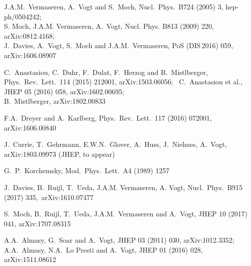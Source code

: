 \documentclass[12pt]{article}
\begin{document}
{\footnotesize

% 
% 

\providecommand{\href}[2]{#2}\begingroup\raggedright\begin{thebibliography}{100}

J.A.M.~Vermaseren, A.~Vogt and S.~Moch,
  Nucl.\ Phys.\ B724 (2005) 3, hep-ph/0504242; \\[0.2mm]
S. Moch, J.A.M. Vermaseren, A.~Vogt,
  Nucl. Phys. B813 (2009) 220, arXiv:0812.4168; \\[0.2mm]
J.~Davies, A.~Vogt, S.~Moch and J.A.M.~Vermaseren,
  PoS (DIS$\,$2016) 059, arXiv:1606.08907

C.~Anastasiou, C.~Duhr, F.~Dulat, F.~Herzog and B.~Mistlberger,
  Phys.\ Rev.\ Lett.\ 114 (2015) 212001, arXiv:1503.06056;~ 
C.~Anastasiou et al.,
  JHEP 05 (2016) 058, arXiv:1602.00695; \\[0.2mm]
B.~Mistlberger,
  arXiv:1802.00833

F.A.~Dreyer and A.~Karlberg,
  Phys.\ Rev.\ Lett.\ 117 (2016) 072001, arXiv:1606.00840

J.~Currie, T.~Gehrmann, E.W.N.~Glover, A.~Huss, J.~Niehues, A.~Vogt,
  arXiv:1803.09973 (JHEP, to appear)

G.~P.~Korchemsky,
  Mod.\ Phys.\ Lett.\ A4 (1989) 1257

J.~Davies, B.~Ruijl, T.~Ueda, J.A.M. Vermaseren, A. Vogt,
  Nucl.\ Phys.\ B915 (2017) 335,~arXiv:1610.07477

S.~Moch, B.~Ruijl, T.~Ueda, J.A.M.~Vermaseren and A.~Vogt,
  JHEP 10 (2017) 041, arXiv:1707.08315

A.A.~Almasy, G.~Soar and A.~Vogt,
  JHEP 03 (2011) 030, arXiv:1012.3352; \\[0.2mm]
A.A.~Almasy, N.A.~Lo Presti and A.~Vogt,
  JHEP 01 (2016) 028, arXiv:1511.08612


\end{thebibliography}}
\end{document}
